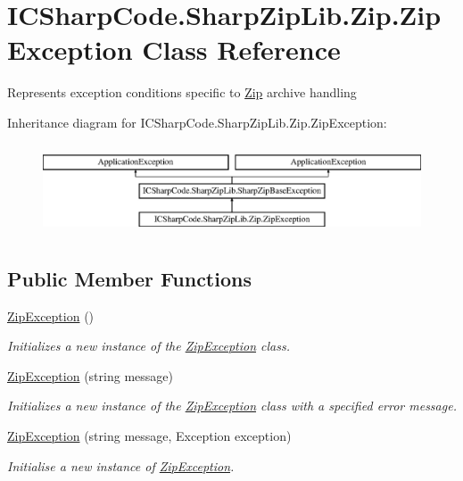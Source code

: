 \hypertarget{class_i_c_sharp_code_1_1_sharp_zip_lib_1_1_zip_1_1_zip_exception}{}\section{I\+C\+Sharp\+Code.\+Sharp\+Zip\+Lib.\+Zip.\+Zip\+Exception Class Reference}
\label{class_i_c_sharp_code_1_1_sharp_zip_lib_1_1_zip_1_1_zip_exception}


Represents exception conditions specific to \hyperlink{namespace_i_c_sharp_code_1_1_sharp_zip_lib_1_1_zip}{Zip} archive handling  


Inheritance diagram for I\+C\+Sharp\+Code.\+Sharp\+Zip\+Lib.\+Zip.\+Zip\+Exception\+:\begin{figure}[H]
\begin{center}
\leavevmode
\includegraphics[height=2.709677cm]{class_i_c_sharp_code_1_1_sharp_zip_lib_1_1_zip_1_1_zip_exception}
\end{center}
\end{figure}
\subsection*{Public Member Functions}
\begin{DoxyCompactItemize}
\item 
\hyperlink{class_i_c_sharp_code_1_1_sharp_zip_lib_1_1_zip_1_1_zip_exception_ad9203a46c2471045257d7a29566b3f2b}{Zip\+Exception} ()
\begin{DoxyCompactList}\small\item\em Initializes a new instance of the \hyperlink{class_i_c_sharp_code_1_1_sharp_zip_lib_1_1_zip_1_1_zip_exception}{Zip\+Exception} class. \end{DoxyCompactList}\item 
\hyperlink{class_i_c_sharp_code_1_1_sharp_zip_lib_1_1_zip_1_1_zip_exception_a165c9251bdcb11b3d6870e4939862dda}{Zip\+Exception} (string message)
\begin{DoxyCompactList}\small\item\em Initializes a new instance of the \hyperlink{class_i_c_sharp_code_1_1_sharp_zip_lib_1_1_zip_1_1_zip_exception}{Zip\+Exception} class with a specified error message. \end{DoxyCompactList}\item 
\hyperlink{class_i_c_sharp_code_1_1_sharp_zip_lib_1_1_zip_1_1_zip_exception_a58a5042586b6da5c9403b751536c4096}{Zip\+Exception} (string message, Exception exception)
\begin{DoxyCompactList}\small\item\em Initialise a new instance of \hyperlink{class_i_c_sharp_code_1_1_sharp_zip_lib_1_1_zip_1_1_zip_exception}{Zip\+Exception}. \end{DoxyCompactList}\end{DoxyCompactItemize}
